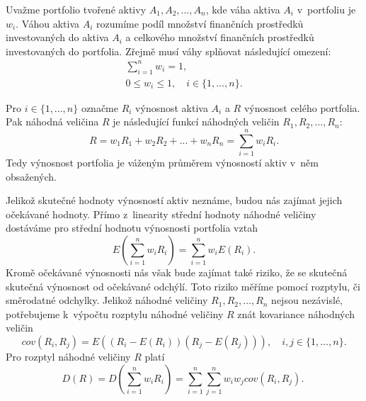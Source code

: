 \documentclass[12pt,a4paper]{report}
\begin{document}
Uvažme portfolio tvořené aktivy $A_1,A_2,\dots,A_n$, kde váha aktiva $A_i$ v~portfoliu je $w_i$. Váhou aktiva $A_i$ rozumíme podíl množství finančních prostředků investovaných do aktiva $A_i$ a celkového množství finančních prostředků investovaných do portfolia. Zřejmě musí váhy splňovat následující omezení:
\begin{gather}
\sum_{i=1}^n w_i = 1 \label{wr1}, \\
0 \leq w_i \leq 1, \quad i\in\{1,\dots,n\}. \label{wr2}
\end{gather}

Pro $i \in \{1,\dots, n\}$ označme $R_i$ výnosnost aktiva $A_i$ a $R$ výnosnost celého portfolia. Pak náhodná veličina $R$ je následující funkcí náhodných veličin  $R_1,R_2,\dots,R_n$:
\[
R = w_1R_1+w_2R_2+\dots+w_nR_n = \sum_{i=1}^n w_iR_i.
\]
Tedy výnosnost portfolia je váženým průměrem výnosností aktiv v~něm obsažených.

Jelikož skutečné hodnoty výnosností aktiv neznáme, budou nás zajímat jejich očekávané hodnoty. Přímo z~linearity střední hodnoty náhodné veličiny dostáváme pro střední hodnotu výnosnosti portfolia vztah
\begin{equation}
E\left(\sum_{i=1}^n w_iR_i\right)=\sum_{i=1}^n w_iE(R_i). \label{ER}
\end{equation}
Kromě očekávané výnosnosti nás však bude zajímat také riziko, že se skutečná skutečná výnosnost od očekávané odchýlí. Toto riziko měříme pomocí rozptylu, či směrodatné odchylky. Jelikož náhodné veličiny $R_1,R_2,\dots,R_n$ nejsou nezávislé, potřebujeme k~výpočtu rozptylu náhodné veličiny $R$ znát kovariance náhodných veličin
\[
cov(R_i, R_j)=E\left( \left(R_i - E(R_i) \right)\left(R_j - E(R_j) \right)\right), \quad i,j \in \{1,\dots, n\}.
\]
Pro rozptyl náhodné veličiny $R$ platí
\[
D(R)=D\left(\sum_{i=1}^n w_iR_i\right)=\sum_{i=1}^n \sum_{j=1}^n w_iw_jcov(R_i,R_j).\
\]

\end{document}
